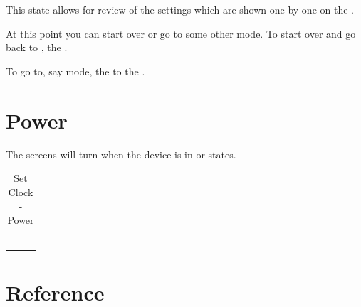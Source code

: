 This state allows for review of the settings which are shown one by one on the
.

\par\medskip

At this point you can start over or go to some other mode.  To start over and go
back to ,  the .


To go to, say  mode,  the  to the .


\section{Power}

The screens will turn  when the device is in  or 
states.

\begin{table}[H]
\begin{tabu}{ X[1,c,m] | X[1,c,m] | X[1,c,m] }
  \thrule
   &  &  \\ \mrule

   & 
    &  \\ 
   & & \\

  \bhrule
\end{tabu}
\caption {Set Clock - Power}
\end{table}

\section{Reference} \label{Set Clock - Reference}

